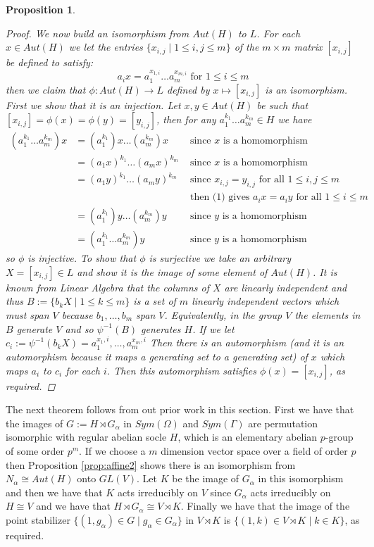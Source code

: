 \documentclass[]{article}
\newtheorem{prop}[thm]{Proposition}
\theoremstyle{definition}
\begin{document}
\begin{prop}
\begin{proof}
	We now build an isomorphism from $Aut(H)$ to $L$. For each $x \in Aut(H)$ we let the entries $\{x_{i,j} \; | \; 1 \leq i,j \leq m \}$ of the $m \times m$ matrix $[x_{i,j}]$ be defined to satisfy:
	\begin{equation}
		a_i x = a_1^{x_{1,i}}\dots a_m^{x_{m,i}} \mbox{ for } 1 \leq i \leq m
	\end{equation} 
	then we claim that $\phi:Aut(H) \rightarrow L$ defined by $x \mapsto [x_{i,j}]$ is an isomorphism. First we show that it is an injection. Let $x,y \in Aut(H)$ be such that $[x_{i,j}]=\phi(x)=\phi(y)=[y_{i,j}]$, then for any $a_1^{k_1}\dots a_m^{k_m} \in H$ we have
	\begin{align*}
	(a_1^{k_1}\dots a_m^{k_m})x & = (a_1^{k_1})x\dots (a_m^{k_m})x & \mbox{ since } x \mbox{ is a homomorphism} \\
	& = (a_1x)^{k_1}\dots(a_mx)^{k_m} & \mbox{ since } x \mbox{ is a homomorphism} \\
	& = (a_1y)^{k_1}\dots(a_my)^{k_m} & \mbox{ since } x_{i,j} = y_{i,j} \mbox{ for all } 1\leq i,j \leq m \\
	& & \mbox{ then (1) gives } a_ix=a_iy \mbox{ for all } 1 \leq i \leq m \\
	& =(a_1^{k_1})y\dots (a_m^{k_m})y & \mbox{ since } y \mbox{ is a homomorphism} \\
	& = (a_1^{k_1}\dots a_m^{k_m})y & \mbox{ since } y \mbox{ is a homomorphism}	
	\end{align*}
so $\phi$ is injective. To show that $\phi$ is surjective we take an arbitrary $X=[x_{i,j}] \in L$ and show it is the image of some element of $Aut(H)$. It is known from Linear Algebra that the columns of $X$ are linearly independent and thus $B:=\{b_k X \; | \; 1 \leq k \leq m \}$ is a set of $m$ linearly independent vectors which must span $V$ because $b_1,\dots,b_m$ span $V$. Equivalently, in the group $V$ the elements in $B$ generate $V$ and so $\psi^{-1}(B)$ generates $H$. If we let $c_i:=\psi^{-1}(b_k X)=a_1^{x_1,i},\dots, a_m^{x_m,i}$ Then there is an automorphism (and it is an automorphism because it maps a generating set to a generating set) of $x$ which maps $a_i$ to $c_i$ for each $i$. Then this automorphism satisfies $\phi(x)=[x_{i,j}]$, as required.
\end{proof}
\end{prop}

The next theorem follows from out prior work in this section. First we have that the images of $G:=H \rtimes G_\alpha$ in $Sym(\Omega)$ and $Sym(\Gamma)$ are permutation isomorphic with regular abelian socle $H$, which is an elementary abelian $p$-group of some order $p^m$. If we choose a $m$ dimension vector space over a field of order $p$ then Proposition \ref{prop:affine2} shows there is an isomorphism from $N_\alpha \cong Aut(H)$ onto $GL(V)$. Let $K$ be the image of $G_\alpha$ in this isomorphism and then we have that $K$ acts irreducibly on $V$ since $G_\alpha$ acts irreducibly on $H \cong V$ and we have that $H \rtimes G_\alpha \cong V \rtimes K$. Finally we have that the image of the point stabilizer $\{(1,g_\alpha) \in G \; | \; g_\alpha \in G_\alpha\}$ in $V \rtimes K$ is $\{(1,k) \in V \rtimes K \; | \; k \in K \}$, as required.
\end{document}
